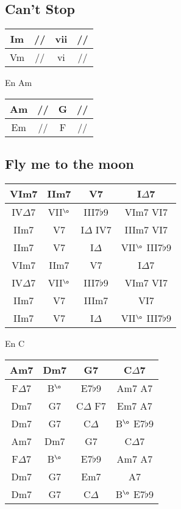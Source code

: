 \documentclass[a4paper,10pt]{article}
\begin{document}
\subsection{Can't Stop}
\begin{tabular}{ | c | c | c | c | } \hline			
	Im & // & vii & // \\ \hline  
	Vm & // & vi & // \\ \hline
\end{tabular}
\newline
\newline

En Am

\begin{tabular}{ | c | c | c | c | } \hline			
	Am & // & G & // \\ \hline  
	Em & // & F & // \\ \hline
\end{tabular}
\newpage

\subsection{Fly me to the moon}

\begin{tabular}{ | c | c | c | c | } \hline			
	VIm7 & IIm7 & V7 & I$\Delta$7 \\ \hline  
	IV$\Delta$7 & VII$^{\o}$ & III7$\flat$9 & VIm7 VI7 \\ \hline  
	IIm7 & V7 & I$\Delta$ IV7 & IIIm7 VI7 \\ \hline  
	IIm7 & V7 & I$\Delta$ & VII$^{\o}$ III7$\flat$9 \\ \hline  \hline
	VIm7 & IIm7 & V7 & I$\Delta$7 \\ \hline  
	IV$\Delta$7 & VII$^{\o}$ & III7$\flat$9 & VIm7 VI7 \\ \hline  
	IIm7 & V7 & IIIm7 & VI7 \\ \hline  
	IIm7 & V7 & I$\Delta$ & VII$^{\o}$ III7$\flat$9 \\ \hline  
\end{tabular}
\newline
\newline

En  C

\begin{tabular}{ | c | c | c | c | } \hline			
	Am7 & Dm7 & G7 & C$\Delta$7 \\ \hline  
	F$\Delta$7 & B$^{\o}$ & E7$\flat$9 & Am7 A7 \\ \hline  
	Dm7 & G7 & C$\Delta$ F7 & Em7 A7 \\ \hline  
	Dm7 & G7 & C$\Delta$ & B$^{\o}$ E7$\flat$9 \\ \hline  \hline
	Am7 & Dm7 & G7 & C$\Delta$7 \\ \hline  
	F$\Delta$7 & B$^{\o}$ & E7$\flat$9 & Am7 A7 \\ \hline  
	Dm7 & G7 & Em7 & A7 \\ \hline  
	Dm7 & G7 & C$\Delta$ & B$^{\o}$ E7$\flat$9 \\ \hline  
\end{tabular}
\newpage
\end{document}
